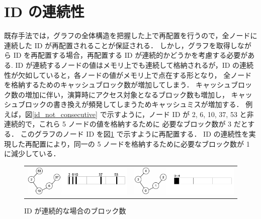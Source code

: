 \section{ID の連続性}
既存手法では，グラフの全体構造を把握した上で再配置を行うので，全ノードに連続した ID が再配置されることが保証される．
しかし，グラフを取得しながら ID を再配置する場合，再配置する ID が連続的かどうかを考慮する必要がある.
ID が連続するノードの値はメモリ上でも連続して格納されるが，ID の連続性が欠如していると，各ノードの値がメモリ上で点在する形となり，
全ノードを格納するためのキャッシュブロック数が増加してしまう．
キャッシュブロック数の増加に伴い，演算時にアクセス対象となるブロック数も増加し，
キャッシュブロックの書き換えが頻発してしまうためキャッシュミスが増加する．
例えば，図\ref{id_not_consecutive} で示すように，ノード ID が 2, 6, 10, 37, 53 と非連続的で，これら 5 ノードの値を格納するために
必要なブロック数が 3 だとする．
このグラフのノード ID を図\ref{id_consecutive} で示すように再配置する．
ID の連続性を実現した再配置により，同一の 5 ノードを格納するために必要なブロック数が 1 に減少している．
\begin{figure}[t]
  \begin{tabular}{cc}
    \begin{minipage}[t]{0.45\hsize}
      \centering
      \includegraphics[width=7cm]{./figure/id_not_consecutive.pdf}
      \caption{ID が非連続的な場合のブロック数}
      \label{id_not_consecutive}
    \end{minipage} &
    \begin{minipage}[t]{0.45\hsize}
      \centering
      \includegraphics[width=7cm]{./figure/id_consecutive.pdf}
      \caption{ID が連続的な場合のブロック数}
      \label{id_consecutive}
    \end{minipage}
  \end{tabular}
\end{figure}
